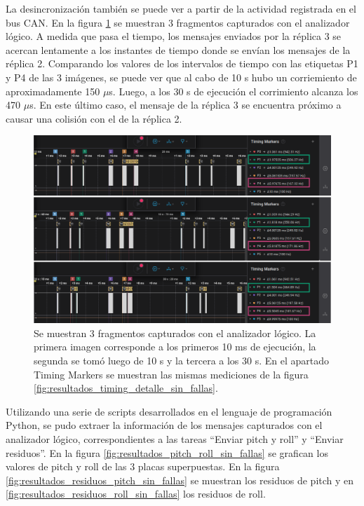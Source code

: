 La desincronización también se puede ver a partir de la actividad registrada en el bus CAN. En la figura \ref{fig:resultados_timing_detalle_placa_3_no_sync} se muestran 3 fragmentos capturados con el analizador lógico. A medida que pasa el tiempo, los mensajes enviados por la réplica 3 se acercan lentamente a los instantes de tiempo donde se envían los mensajes de la réplica 2. Comparando los valores de los intervalos de tiempo con las etiquetas P1 y P4 de las 3 imágenes, se puede ver que al cabo de 10 s hubo un corriemiento de aproximadamente 150 $\mu$s. Luego, a los 30 s de ejecución el corrimiento alcanza los 470 $\mu$s. En este último caso, el mensaje de la réplica 3 se encuentra próximo a causar una colisión con el de la réplica 2.

\begin{figure}[!t]
    \centering
    \includegraphics[width=\textwidth]{img/resultados_timing_detalle_placa_3_no_sync.png}
    \caption{Se muestran 3 fragmentos capturados con el analizador lógico. La primera imagen corresponde a los primeros 10 ms de ejecución, la segunda se tomó luego de 10 s y la tercera a los 30 s. En el apartado Timing Markers se muestran las mismas mediciones de la figura \ref{fig:resultados_timing_detalle_sin_fallas}.}
    \label{fig:resultados_timing_detalle_placa_3_no_sync}
\end{figure}

Utilizando una serie de scripts desarrollados en el lenguaje de programación Python, se pudo extraer la información de los mensajes capturados con el analizador lógico, correspondientes a las tareas ``Enviar pitch y roll'' y ``Enviar residuos''. En la figura \ref{fig:resultados_pitch_roll_sin_fallas} se grafican los valores de pitch y roll de las 3 placas superpuestas. En la figura \ref{fig:resultados_residuos_pitch_sin_fallas} se muestran los residuos de pitch y en \ref{fig:resultados_residuos_roll_sin_fallas} los residuos de roll.


